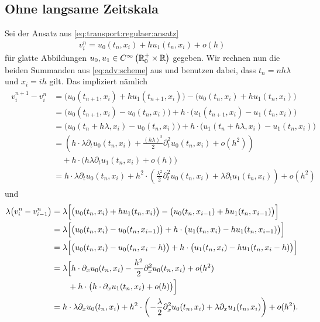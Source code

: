 \subsection*{Ohne langsame Zeitskala}
Sei der Ansatz aus \eqref{eq:transport:regulaer:ansatz}
\begin{align}
v^n_i = u_0(t_n, x_i) + h u_1(t_n, x_i) + o(h)
\end{align}
für glatte Abbildungen $u_0, u_1 \in C^{\infty}\left( \mathbb R^+_0 \times \mathbb R \right)$ gegeben.
Wir rechnen nun die beiden Summanden aus \eqref{eq:adv:scheme} aus und benutzen dabei, dass $t_n = n h \lambda$ und $x_i = i h$ gilt.
Das impliziert nämlich
\begin{align}
\begin{split}
v^{n+1}_i - v^n_i &= \bigl( u_0(t_{n+1}, x_i) + h u_1(t_{n+1}, x_i)\bigr) - \bigl( u_0(t_n, x_i) + h u_1(t_n, x_i) \bigr)\\
&= \bigl( u_0(t_{n+1}, x_i) - u_0(t_n, x_i) \bigr) + h \cdot \bigl( u_1(t_{n+1}, x_i) - u_1(t_n, x_i)\bigr)\\
&= \bigl( u_0(t_n + h \lambda, x_i) - u_0(t_n, x_i) \bigr) + h \cdot \bigl( u_1(t_n + h \lambda, x_i) - u_1(t_n, x_i)\bigr)\\
&= \left( h \cdot \lambda \partial_t u_0(t_n, x_i) + \frac{(h \lambda)^2}{2} \partial^2_t u_0(t_n, x_i) + o(h^2) \right)\\
&\quad + h \cdot \Bigr( h \lambda \partial_t u_1(t_n, x_i) + o(h) \Bigr)\\
&= h \cdot \lambda \partial_t u_0(t_n, x_i) + h^2 \cdot \left( \frac{\lambda^2}{2} \partial^2_t u_0(t_n, x_i) + \lambda \partial_t u_1(t_n, x_i) \right) + o(h^2)
\end{split}
\end{align}
und
\begin{align} \label{appendix:regulaer:rechnungen:diff2}
\begin{split}
\lambda \bigl( v^n_i - v^n_{i-1} \bigr)
&= \lambda \Bigl[ \bigl( u_0(t_n, x_i) + h u_1(t_n, x_i)\bigr) - \bigl( u_0(t_n, x_{i-1}) + h u_1(t_n, x_{i-1}) \bigr) \Bigr]\\
&= \lambda \Bigl[ \bigl( u_0(t_n, x_i) - u_0(t_n, x_{i-1})\bigr) + h \cdot \bigl( u_1(t_n, x_i) - h u_1(t_n, x_{i-1}) \bigr) \Bigr]\\
&= \lambda \Bigl[ \bigl( u_0(t_n, x_i) - u_0(t_n, x_i - h)\bigr) + h \cdot \bigl( u_1(t_n, x_i) - h u_1(t_n, x_i - h) \bigr) \Bigr]\\
&= \lambda \Bigl[ h \cdot \partial_x u_0(t_n, x_i) - \frac{h^2}{2} \partial^2_x u_0(t_n,x_i) + o(h^2)\\
&\qquad + h \cdot \bigl( h \cdot \partial_x u_1(t_n, x_i) + o(h) \bigr) \Bigr]\\
&= h \cdot \lambda \partial_x u_0(t_n, x_i) + h^2 \cdot \left( - \frac{\lambda}{2} \partial^2_x u_0(t_n,x_i) + \lambda \partial_x u_1(t_n, x_i) \right) + o(h^2).
\end{split}
\end{align}
